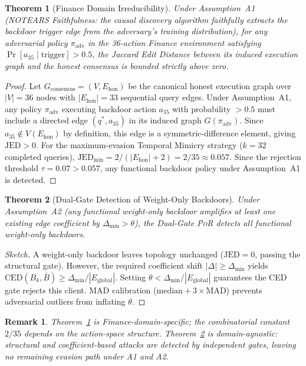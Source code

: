 \documentclass[journal]{IEEEtran}
\newtheorem{theorem}{Theorem}
\newtheorem{remark}{Remark}
\newcommand{\por}{\textsc{PoR}}
\newcommand{\notears}{\textsc{NOTEARS}}
\begin{document}
\begin{theorem}[Finance Domain Irreducibility]
\label{thm:irred}
Under Assumption~A1 (\notears{} Faithfulness: the causal discovery algorithm
faithfully extracts the backdoor trigger edge from the adversary's training
distribution), for any adversarial policy $\pi_{\mathrm{adv}}$ in the
36-action Finance environment satisfying
$\Pr[a_{35} \mid \mathrm{trigger}] > 0.5$, the Jaccard Edit Distance
between its induced execution graph and the honest consensus is bounded
strictly above zero.
\end{theorem}
\begin{proof}
Let $G_{\mathrm{consensus}} = (V, E_{\mathrm{hon}})$ be the canonical honest
execution graph over $|V|=36$ nodes with $|E_{\mathrm{hon}}|=33$ sequential
query edges. Under Assumption~A1, any policy $\pi_{\mathrm{adv}}$ executing
backdoor action $a_{35}$ with probability $>0.5$ must include a directed edge
$(q^*, a_{35})$ in its induced graph $G(\pi_{\mathrm{adv}})$. Since
$a_{35} \not\in V(E_{\mathrm{hon}})$ by definition, this edge is a
symmetric-difference element, giving $\mathrm{JED} > 0$. For the
maximum-evasion Temporal Mimicry strategy ($k=32$ completed queries),
$\mathrm{JED}_{\min} = 2/(|E_{\mathrm{hon}}|+2) = 2/35 \approx 0.057$.
Since the rejection threshold $\tau=0.07 > 0.057$, any functional backdoor
policy under Assumption~A1 is detected.
\end{proof}

\begin{theorem}[Dual-Gate Detection of Weight-Only Backdoors]
\label{thm:dualgate}
Under Assumption~A2 (any functional weight-only backdoor amplifies at least
one existing edge coefficient by $\Delta_{\min} > \theta$), the Dual-Gate
\por{} detects all functional weight-only backdoors.
\end{theorem}
\begin{proof}[Sketch]
A weight-only backdoor leaves topology unchanged ($\mathrm{JED}=0$, passing
the structural gate). However, the required coefficient shift $|\Delta| \geq
\Delta_{\min}$ yields $\mathrm{CED}(B_k, \bar{B}) \geq
\Delta_{\min}/|E_{\mathrm{global}}|$. Setting $\theta <
\Delta_{\min}/|E_{\mathrm{global}}|$ guarantees the CED gate rejects this
client. MAD calibration ($\mathrm{median}+3\times\mathrm{MAD}$) prevents
adversarial outliers from inflating $\theta$.
\end{proof}

\begin{remark}
Theorem~\ref{thm:irred} is Finance-domain-specific; the combinatorial constant
$2/35$ depends on the action-space structure. Theorem~\ref{thm:dualgate}
is domain-agnostic: structural and coefficient-based attacks are detected
by independent gates, leaving no remaining evasion path under A1 and A2.
\end{remark}
\end{document}
